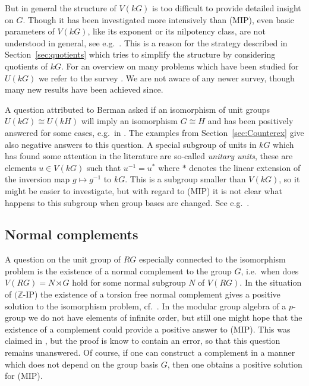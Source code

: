 \documentclass[11pt, a4paper]{amsart}
\theoremstyle{definition}
\begin{document}
But in general the structure of $V(kG)$ is too difficult to provide detailed insight on $G$. Though it has been investigated more intensively than (MIP), even basic parameters of $V(kG)$, like its exponent or its nilpotency class, are not understood in general, see e.g.\ \cite{Shalev91}. This is a reason for the strategy described in Section~\ref{sec:quotients} which tries to simplify the structure by considering quotients of $kG$. For an overview on many problems which have been studied for $U(kG)$ we refer to the survey \cite{BovdiUnitsSurvey}. We are not aware of any newer survey, though many new results have been achieved since.

A question attributed to Berman asked if an isomorphism of unit groups $U(kG) \cong U(kH)$ will imply an isomorphism $G \cong H$ and has been positively answered for some cases, e.g.\ in \cite{BaloghBovdi04}. The examples from Section~\ref{sec:Counterex} give also negative answers to this question. A special subgroup of units in $kG$ which has found some attention in the literature are so-called \emph{unitary units}, these are elements $u \in V(kG)$ such that $u^{-1} = u^*$ where $*$ denotes the linear extension of the inversion map $g \mapsto g^{-1}$ to $kG$. This is a subgroup smaller than $V(kG)$, so it might be easier to investigate, but with regard to (MIP) it is not clear what happens to this subgroup when group bases are changed. See e.g.\ \cite{BaloghBovdi20, Balogh21}.

\subsection{Normal complements}\label{sec:NormalComplements}

A question on the unit group of $RG$ especially connected to the isomorphism problem is the existence of a normal complement to the group $G$, i.e.\ when does $V(RG) = N \rtimes G$ hold for some normal subgroup $N$ of $V(RG)$. In the situation of $(\mathbb{Z}$-IP) the existence of a torsion free normal complement gives a positive solution to the isomorphism problem, cf.\ \cite[Chapter 4]{Sehgal93}. In the modular group algebra of a $p$-group we do not have elements of infinite order, but still one might hope that the existence of a complement could provide a positive answer to (MIP).  This was claimed in \cite{Roehl91}, but the proof is know to contain an error, so that this question remains unanswered. Of course, if one can construct a complement in a manner which does not depend on the group basis $G$, then one obtains a positive solution for (MIP).
\end{document}
